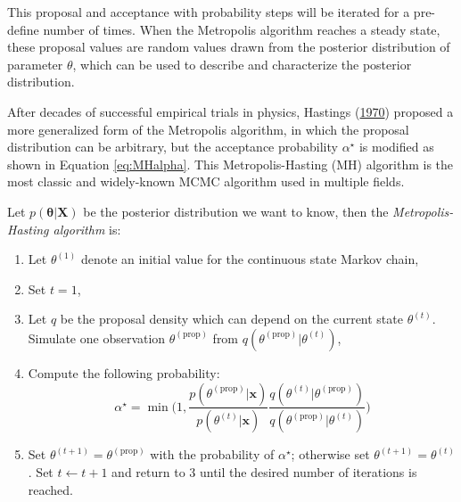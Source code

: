 \documentclass[12pt]{book}
\numberwithin{equation}{chapter}
\providecommand{\tightlist}{%
  \setlength{\itemsep}{0pt}\setlength{\parskip}{0pt}}
\begin{document}
This proposal and acceptance with probability steps will be iterated for a pre-define number of times. When the Metropolis algorithm reaches a steady state, these proposal values are random values drawn from the posterior distribution of parameter \(\theta\), which can be used to describe and characterize the posterior distribution.

After decades of successful empirical trials in physics, Hastings (\protect\hyperlink{ref-hastings1970monte}{1970}) proposed a more generalized form of the Metropolis algorithm, in which the proposal distribution can be arbitrary, but the acceptance probability \(\alpha^\star\) is modified as shown in Equation \eqref{eq:MHalpha}. This Metropolis-Hasting (MH) algorithm is the most classic and widely-known MCMC algorithm used in multiple fields.

Let \(p(\mathbf{\theta|X})\) be the posterior distribution we want to know, then the \emph{Metropolis-Hasting algorithm} is:

\begin{enumerate}
\def\labelenumi{\arabic{enumi}.}
\tightlist
\item
  Let \(\theta^{(1)}\) denote an initial value for the continuous state Markov chain,
\item
  Set \(t = 1\),
\item
  Let \(q\) be the proposal density which can depend on the current state \(\theta^{(t)}\). Simulate one observation \(\theta^{(\text{prop})}\) from \(q(\theta^{(\text{prop})} | \theta^{(t)})\),
\item
  Compute the following probability:
  \begin{equation}
  \alpha^\star = \min\bigg(1, \frac{p\left(\theta^{(\text{prop})} | \boldsymbol{x}\right)}{p\left(\theta^{(t)} | \boldsymbol{x}\right)} \frac{q\left(\theta^{(t)} | \theta^{(\text{prop})}\right)}{q\left(\theta^{(\text{prop})} | \theta^{(t)}\right)}\bigg)
  \label{eq:MHalpha}
  \end{equation}
\item
  Set \(\theta^{(t+1)} = \theta^{(\text{prop})}\) with the probability of \(\alpha^\star\); otherwise set \(\theta^{(t+1)} = \theta^{(t)}\). Set \(t \leftarrow t + 1\) and return to 3 until the desired number of iterations is reached.
\end{enumerate}
\end{document}
